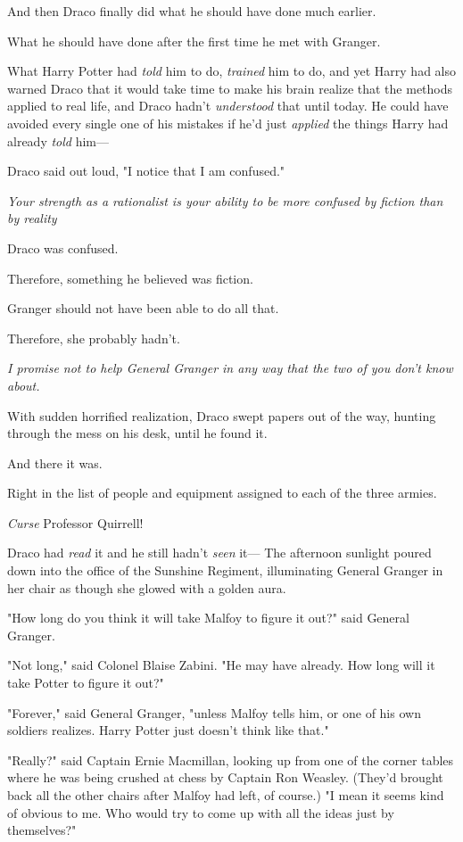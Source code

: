 And then Draco finally did what he should have done much earlier.

What he should have done after the first time he met with Granger.

What Harry Potter had \emph{told} him to do, \emph{trained} him to do, and yet
Harry had also warned Draco that it would take time to make his brain realize
that the methods applied to real life, and Draco hadn't \emph{understood} that
until today. He could have avoided every single one of his mistakes if he'd
just \emph{applied} the things Harry had already \emph{told} him---

Draco said out loud, "I notice that I am confused."

\emph{Your strength as a rationalist is your ability to be more confused by
fiction than by reality{\el}}

Draco was confused.

Therefore, something he believed was fiction.

Granger should not have been able to do all that.

Therefore, she probably hadn't.

\emph{I promise not to help General Granger in any way that the two of you
don't know about.}

With sudden horrified realization, Draco swept papers out of the way, hunting
through the mess on his desk, until he found it.

And there it was.

Right in the list of people and equipment assigned to each of the three armies.

\emph{Curse} Professor Quirrell!

Draco had \emph{read} it and he still hadn't \emph{seen} it---
\sbreak
The afternoon sunlight poured down into the office of the Sunshine Regiment,
illuminating General Granger in her chair as though she glowed with a golden
aura.

"How long do you think it will take Malfoy to figure it out?" said General
Granger.

"Not long," said Colonel Blaise Zabini. "He may have already. How long will it
take Potter to figure it out?"

"Forever," said General Granger, "unless Malfoy tells him, or one of his own
soldiers realizes. Harry Potter just doesn't think like that."

"Really?" said Captain Ernie Macmillan, looking up from one of the corner
tables where he was being crushed at chess by Captain Ron Weasley. (They'd
brought back all the other chairs after Malfoy had left, of course.) "I mean it
seems kind of obvious to me. Who would try to come up with all the ideas just
by themselves?"

